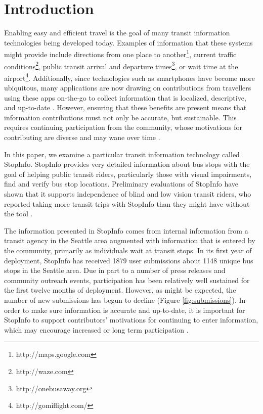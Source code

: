 \section{Introduction}
\label{sec:intro}



Enabling easy and efficient travel is the goal of many transit information technologies being developed today. Examples of information that these systems might provide include directions from one place to another\footnote{http://maps.google.com}, current traffic conditions\footnote{http://waze.com}, public transit arrival and departure times\footnote{http://onebusaway.org}, or wait time at the airport\footnote{http://gomiflight.com/}. Additionally, since technologies such as smartphones have become more ubiquitous, many applications are now drawing on contributions from travellers using these apps on-the-go to collect information that is localized, descriptive, and up-to-date \cite{harding-2013}. However, ensuring that these benefits are present means that information contributions must not only be accurate, but sustainable. This requires continuing participation from the community, whose motivations for contributing are diverse and may wane over time \cite{moore-2007}.

In this paper, we examine a particular transit information technology called StopInfo. StopInfo provides very detailed information about bus stops with the goal of helping public transit riders, particularly those with visual impairments, find and verify bus stop locations. Preliminary evaluations of StopInfo have shown that it supports independence of blind and low vision transit riders, who reported taking more transit trips with StopInfo than they might have without the tool \cite{campbell-2014}. 

The information presented in StopInfo comes from internal information from a transit agency in the Seattle area augmented with information that is entered by the community, primarily as individuals wait at transit stops. In its first year of deployment, StopInfo has received 1879 user submissions about 1148 unique bus stops in the Seattle area. Due in part to a number of press releases and community outreach events, participation has been relatively well sustained for the first twelve months of deployment. However, as might be expected, the number of new submissions has begun to decline (Figure \ref{fig:submissions}). In order to make sure information is accurate and up-to-date, it is important for StopInfo to support contributors' motivations for continuing to enter information, which may encourage increased or long term participation \cite{reed-2013}.

